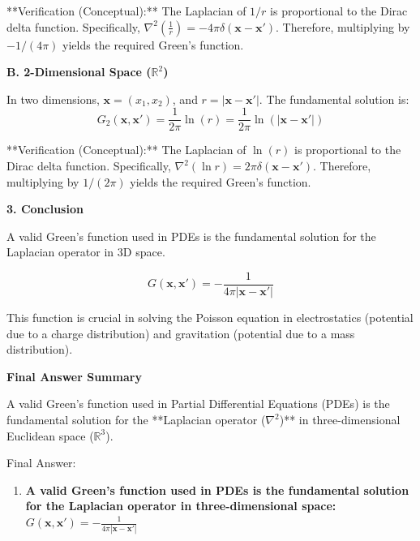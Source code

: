 \documentclass[12pt,a4paper]{report}
\begin{document}
{\begin{description}
\begin{description}
**Verification (Conceptual):** The Laplacian of $1/r$ is proportional to the Dirac delta function. Specifically, $\nabla^2 \left(\frac{1}{r}\right) = -4\pi \delta(\mathbf{x} - \mathbf{x}')$. Therefore, multiplying by $-1/(4\pi)$ yields the required Green's function.

\item \textbf{B. 2-Dimensional Space ($\mathbb{R}^2$)}

In two dimensions, $\mathbf{x} = (x_1, x_2)$, and $r = |\mathbf{x} - \mathbf{x}'|$. The fundamental solution is:
$$G_2(\mathbf{x}, \mathbf{x}') = \frac{1}{2\pi} \ln(r) = \frac{1}{2\pi} \ln(|\mathbf{x} - \mathbf{x}'|)$$

**Verification (Conceptual):** The Laplacian of $\ln(r)$ is proportional to the Dirac delta function. Specifically, $\nabla^2 (\ln r) = 2\pi \delta(\mathbf{x} - \mathbf{x}')$. Therefore, multiplying by $1/(2\pi)$ yields the required Green's function.

\end{description}

\item \textbf{3. Conclusion}

A valid Green's function used in PDEs is the fundamental solution for the Laplacian operator in 3D space.

$$G(\mathbf{x}, \mathbf{x}') = -\frac{1}{4\pi |\mathbf{x} - \mathbf{x}'|}$$

This function is crucial in solving the Poisson equation in electrostatics (potential due to a charge distribution) and gravitation (potential due to a mass distribution).

\item \textbf{Final Answer Summary}

A valid Green's function used in Partial Differential Equations (PDEs) is the fundamental solution for the **Laplacian operator ($\nabla^2$)** in three-dimensional Euclidean space ($\mathbb{R}^3$).


Final Answer:
\begin{enumerate}
\item \textbf{A valid Green's function used in PDEs is the fundamental solution for the Laplacian operator in three-dimensional space: \(G(\mathbf{x}, \mathbf{x}') = -\frac{1}{4\pi |\mathbf{x} - \mathbf{x}'|}\)}


\end{enumerate}
\end{description}}
\end{document}
